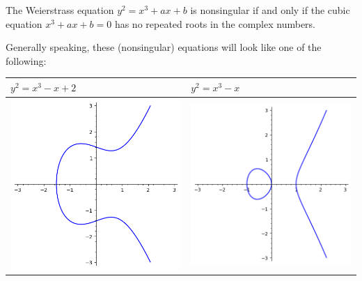 \documentclass[letterpaper]{article}
\begin{document}
\begin{theorem}{}{}
    The Weierstrass equation $y^2 = x^3 + ax + b$ is nonsingular if and only if the cubic equation $x^3 + ax + b = 0$ has no repeated roots in the complex numbers.
\end{theorem}
Generally speaking, these (nonsingular) equations will look like one of the following:
\begin{center}
    \begin{tabular}{p{3in}|p{3in}}

        $y^2 = x^3 - x + 2$ & $y^2 = x^3 - x$ \\ 
        \hline 
        
        \bigskip 

        \includegraphics[scale=0.63]{../assets/weiers_1.png}
        &
        
        \bigskip 
        
        \includegraphics[scale=0.63]{../assets/weiers_2.png}
    \end{tabular}
\end{center}
\end{document}
